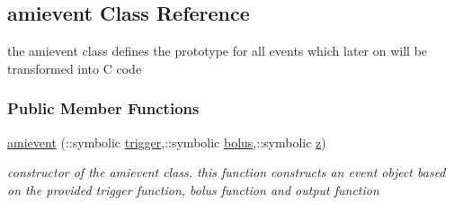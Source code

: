 \hypertarget{classamievent}{}\subsection{amievent Class Reference}
\label{classamievent}


the amievent class defines the prototype for all events which later on will be transformed into C code  


\subsubsection*{Public Member Functions}
\begin{DoxyCompactItemize}
\item 
\hyperlink{classamievent_aa89b0efd53c33a18acf04c1dda76842c}{amievent} (\+::symbolic \hyperlink{classamievent_ae194cb817eae4085f8023885100c68dd}{trigger},\+::symbolic \hyperlink{classamievent_ab9227561ac246ee4b70f9e65c25ffda7}{bolus},\+::symbolic \hyperlink{classamievent_a25ed1bcb423b0b7200f485fc5ff71c8e}{z})
\begin{DoxyCompactList}\small\item\em constructor of the amievent class. this function constructs an event object based on the provided trigger function, bolus function and output function \end{DoxyCompactList}\end{DoxyCompactItemize}
